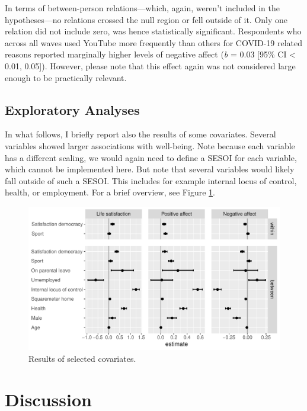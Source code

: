 \documentclass[
  english,
  man,mask,floatsintext]{apa6}
\begin{document}
In terms of between-person relations---which, again, weren't included in the hypotheses---no relations crossed the null region or fell outside of it.
Only one relation did not include zero, was hence statistically significant.
Respondents who across all waves used YouTube more frequently than others for COVID-19 related reasons reported marginally higher levels of negative affect (\emph{b} = 0.03 {[}95\% CI \textless{} 0.01, 0.05{]}).
However, please note that this effect again was not considered large enough to be practically relevant.

\hypertarget{exploratory-analyses}{%
\subsection{Exploratory Analyses}\label{exploratory-analyses}}

In what follows, I briefly report also the results of some covariates.
Several variables showed larger associations with well-being.
Note because each variable has a different scaling, we would again need to define a SESOI for each variable, which cannot be implemented here.
But note that several variables would likely fall outside of such a SESOI.
This includes for example internal locus of control, health, or employment.
For a brief overview, see Figure \ref{fig:res-control}.

\begin{figure}
\includegraphics[width=\textwidth]{figures/fig_results_control} \caption{Results of selected covariates.}\label{fig:res-control}
\end{figure}

\hypertarget{discussion}{%
\section{Discussion}\label{discussion}}
\end{document}

